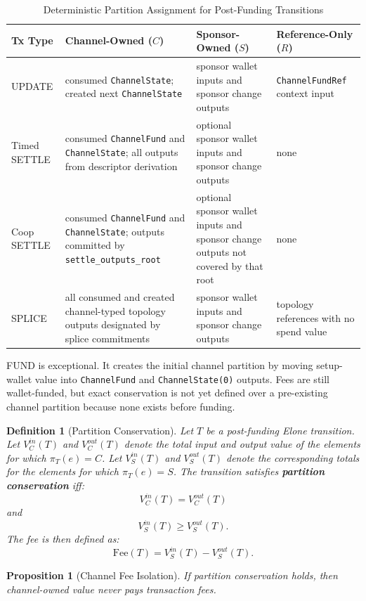 \documentclass[11pt,a4paper]{article}
\newtheorem{proposition}[theorem]{Proposition}
\newtheorem{definition}[theorem]{Definition}
\newcommand{\code}[1]{\texttt{#1}}
\newcommand{\Fee}{\mathrm{Fee}}
\begin{document}
\begin{table}[htbp]
\centering
\caption{Deterministic Partition Assignment for Post-Funding Transitions}
\label{tab:partition_assignment}
\small
\begin{tabularx}{\linewidth}{@{}l X X X@{}}
\toprule
\textbf{Tx Type} & \textbf{Channel-Owned ($C$)} & \textbf{Sponsor-Owned ($S$)} & \textbf{Reference-Only ($R$)} \\
\midrule
UPDATE & consumed \code{ChannelState}; created next \code{ChannelState} & sponsor wallet inputs and sponsor change outputs & \code{ChannelFundRef} context input \\
Timed SETTLE & consumed \code{ChannelFund} and \code{ChannelState}; all outputs from descriptor derivation & optional sponsor wallet inputs and sponsor change outputs & none \\
Coop SETTLE & consumed \code{ChannelFund} and \code{ChannelState}; outputs committed by \code{settle\_outputs\_root} & optional sponsor wallet inputs and sponsor change outputs not covered by that root & none \\
SPLICE & all consumed and created channel-typed topology outputs designated by splice commitments & sponsor wallet inputs and sponsor change outputs & topology references with no spend value \\
\bottomrule
\end{tabularx}
\end{table}

FUND is exceptional. It creates the initial channel partition by moving setup-wallet value into \code{ChannelFund} and \code{ChannelState(0)} outputs. Fees are still wallet-funded, but exact conservation is not yet defined over a pre-existing channel partition because none exists before funding.

\begin{definition}[Partition Conservation]
Let $T$ be a post-funding Elone transition. Let $V_C^{in}(T)$ and $V_C^{out}(T)$ denote the total input and output value of the elements for which $\pi_T(e)=C$. Let $V_S^{in}(T)$ and $V_S^{out}(T)$ denote the corresponding totals for the elements for which $\pi_T(e)=S$. The transition satisfies \textbf{partition conservation} iff:
\[
V_C^{in}(T) = V_C^{out}(T)
\]
and
\[
V_S^{in}(T) \geq V_S^{out}(T).
\]
The fee is then defined as:
\[
\Fee(T) = V_S^{in}(T) - V_S^{out}(T).
\]
\end{definition}

\begin{proposition}[Channel Fee Isolation]
If partition conservation holds, then channel-owned value never pays transaction fees.
\end{proposition}
\end{document}
